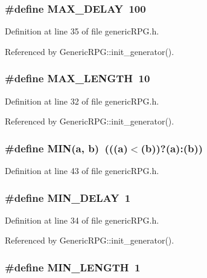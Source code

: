 \subsubsection[{MAX\_\-DELAY}]{\setlength{\rightskip}{0pt plus 5cm}\#define MAX\_\-DELAY~100}\label{genericRPG_8h_16027d8acc5301e440cefa086eb9db2a}




Definition at line 35 of file genericRPG.h.

Referenced by GenericRPG::init\_\-generator().
\subsubsection[{MAX\_\-LENGTH}]{\setlength{\rightskip}{0pt plus 5cm}\#define MAX\_\-LENGTH~10}\label{genericRPG_8h_7a9a231e30b47bc0345749c8bd1e5077}




Definition at line 32 of file genericRPG.h.

Referenced by GenericRPG::init\_\-generator().
\subsubsection[{MIN}]{\setlength{\rightskip}{0pt plus 5cm}\#define MIN(a, \/  b)~(((a)$<$(b))?(a):(b))}\label{genericRPG_8h_3acffbd305ee72dcd4593c0d8af64a4f}




Definition at line 43 of file genericRPG.h.
\subsubsection[{MIN\_\-DELAY}]{\setlength{\rightskip}{0pt plus 5cm}\#define MIN\_\-DELAY~1}\label{genericRPG_8h_d3b51637a39a4ff75bd979b917cb89ef}




Definition at line 34 of file genericRPG.h.

Referenced by GenericRPG::init\_\-generator().
\subsubsection[{MIN\_\-LENGTH}]{\setlength{\rightskip}{0pt plus 5cm}\#define MIN\_\-LENGTH~1}\label{genericRPG_8h_36aadcc60cb05b42dcda5459cd0c8acc}




